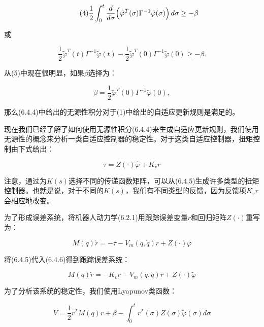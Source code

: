 \documentclass[12pt,a4paper]{ctexart}
\begin{document}
\begin{equation}\tag{4}
\frac{1}{2}\int_0^t \frac{d}{d\sigma}\Bigl(\tilde{\varphi}^T(\sigma)\Gamma^{-1}\tilde{\varphi}(\sigma)\Bigr)\,d\sigma \geq -\beta
\end{equation}

或

\begin{equation}\tag{5}
\frac{1}{2}\tilde{\varphi}^T(t)\Gamma^{-1}\tilde{\varphi}(t) - \frac{1}{2}\tilde{\varphi}^T(0)\Gamma^{-1}\tilde{\varphi}(0) \geq -\beta.
\end{equation}

从(5)中现在很明显，如果$\beta$选择为：

\begin{equation}\tag{6}
\beta = \frac{1}{2}\tilde{\varphi}^T(0)\Gamma^{-1}\tilde{\varphi}(0),
\end{equation}

那么(6.4.4)中给出的无源性积分对于(1)中给出的自适应更新规则是满足的。

现在我们已经了解了如何使用无源性积分(6.4.4)来生成自适应更新规则，我们使用无源性的概念来分析一类自适应控制器的稳定性。对于这类自适应控制器，扭矩控制由下式给出：

\begin{equation}\label{eq:6.4.5}
\tau = Z(\cdot)\hat{\varphi} + K_v r
\end{equation}

注意，通过为$K(s)$选择不同的传递函数矩阵，可以从(6.4.5)生成许多类型的扭矩控制器。也就是说，对于不同的$K(s)$，我们有不同类型的反馈，因为反馈项$K_v r$会相应地改变。

为了形成误差系统，将机器人动力学(6.2.1)用跟踪误差变量$r$和回归矩阵$Z(\cdot)$重写为：

\begin{equation}\label{eq:6.4.6}
M(q)\dot{r} = -\tau - V_m(q, \dot{q})r + Z(\cdot)\varphi
\end{equation}

将(6.4.5)代入(6.4.6)得到跟踪误差系统：

\begin{equation}\label{eq:6.4.7}
M(q)\dot{r} = -K_v r - V_m(q, \dot{q})r + Z(\cdot)\tilde{\varphi}
\end{equation}

为了分析该系统的稳定性，我们使用Lyapunov类函数：

\begin{equation}\label{eq:6.4.8}
V = \frac{1}{2}r^T M(q) r + \beta - \int_0^t r^T(\sigma)Z(\sigma)\tilde{\varphi}(\sigma)d\sigma
\end{equation}
\end{document}
